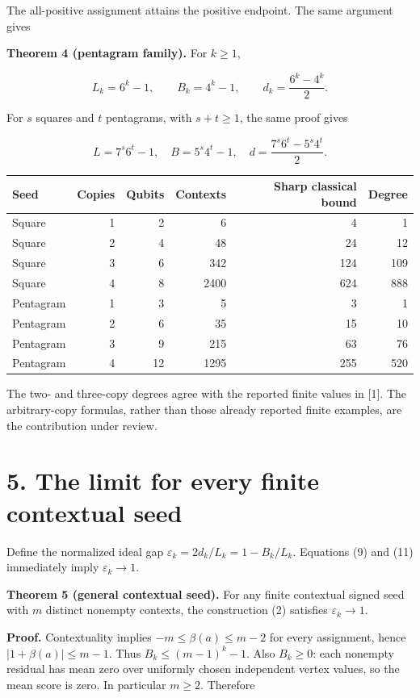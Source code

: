 \documentclass[10pt,a4paper]{article}
\begin{document}
The all-positive assignment attains the positive endpoint. The same argument gives

\textbf{Theorem 4 (pentagram family).} For \(k\ge1\),

\[L_k=6^k-1,\qquad B_k=4^k-1,\qquad
d_k=\frac{6^k-4^k}{2}. \tag{11}\]

For \(s\) squares and \(t\) pentagrams, with \(s+t\ge1\), the same proof gives

\[L=7^s6^t-1,\quad B=5^s4^t-1,\quad
d=\frac{7^s6^t-5^s4^t}{2}. \tag{12}\]

{\def\LTcaptype{table} %
\begin{longtable}[]{@{}lrrrrr@{}}
\toprule\noalign{}
Seed & Copies & Qubits & Contexts & Sharp classical bound & Degree \\
\midrule\noalign{}
\endhead
\bottomrule\noalign{}
\endlastfoot
Square & 1 & 2 & 6 & 4 & 1 \\
Square & 2 & 4 & 48 & 24 & 12 \\
Square & 3 & 6 & 342 & 124 & 109 \\
Square & 4 & 8 & 2400 & 624 & 888 \\
Pentagram & 1 & 3 & 5 & 3 & 1 \\
Pentagram & 2 & 6 & 35 & 15 & 10 \\
Pentagram & 3 & 9 & 215 & 63 & 76 \\
Pentagram & 4 & 12 & 1295 & 255 & 520 \\
\end{longtable}
}

The two- and three-copy degrees agree with the reported finite values in {[}1{]}. The arbitrary-copy formulas, rather than those already reported finite examples, are the contribution under review.

\section{5. The limit for every finite contextual seed}\label{the-limit-for-every-finite-contextual-seed}

Define the normalized ideal gap \(\varepsilon_k=2d_k/L_k=1-B_k/L_k\). Equations (9) and (11) immediately imply \(\varepsilon_k\to1\).

\textbf{Theorem 5 (general contextual seed).} For any finite contextual signed seed with \(m\) distinct nonempty contexts, the construction (2) satisfies \(\varepsilon_k\to1\).

\textbf{Proof.} Contextuality implies \(-m\le\beta(a)\le m-2\) for every assignment, hence \(|1+\beta(a)|\le m-1\). Thus \(B_k\le(m-1)^k-1\). Also \(B_k\ge0\): each nonempty residual has mean zero over uniformly chosen independent vertex values, so the mean score is zero. In particular \(m\ge2\). Therefore
\end{document}
